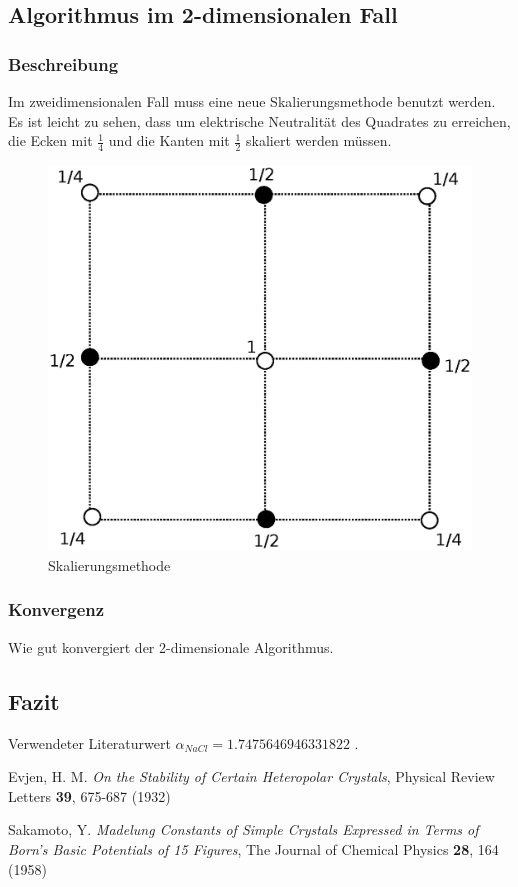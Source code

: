 \documentclass[10pt,a4paper]{article}
\begin{document}
\subsection{Algorithmus im 2-dimensionalen Fall}
\subsubsection{Beschreibung}
Im zweidimensionalen Fall muss eine neue Skalierungsmethode benutzt werden.
Es ist leicht zu sehen, dass um elektrische Neutralität des Quadrates zu
erreichen, die Ecken mit $\frac{1}{4}$ und die Kanten mit $\frac{1}{2}$
skaliert werden müssen.

\begin{figure}[h]
	\centering
	\includegraphics[scale = 0.4]{./figures/quadrat.eps}
	\caption{Skalierungsmethode}
	\label{skalierungsgrafik2d}
\end{figure}

\subsubsection{Konvergenz}

Wie gut konvergiert der 2-dimensionale Algorithmus.

\subsection{Fazit}

Verwendeter Literaturwert $\alpha_{NaCl} = 1.7475646946331822$ \cite{Sakamoto} .


\begin{thebibliography}{9}

Evjen, H. M.
\emph{On the Stability of Certain Heteropolar Crystals},
Physical Review Letters \textbf{39},
675-687 (1932)

Sakamoto, Y.
\emph{Madelung Constants of Simple Crystals Expressed in Terms of Born's Basic
Potentials of 15 Figures},
The Journal of Chemical Physics \textbf{28},
164 (1958)

\end{thebibliography}
\end{document}

